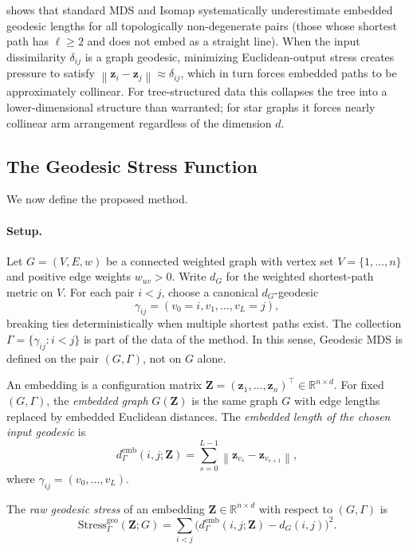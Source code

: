 \documentclass[twoside,11pt]{article}
\newcommand{\R}{\mathbb{R}}
\newcommand{\bz}{\mathbf{z}}
\newcommand{\bZ}{\mathbf{Z}}
\newcommand{\norm}[1]{\left\|#1\right\|}
\newcommand{\demb}{d^{\mathrm{emb}}}
\newcommand{\Stress}{\mathrm{Stress}}
\begin{document}
 shows that standard MDS and Isomap systematically
underestimate embedded geodesic lengths for all topologically
non-degenerate pairs (those whose shortest path has $\ell \geq 2$ and
does not embed as a straight line).  When the input dissimilarity
$\delta_{ij}$ is a graph geodesic, minimizing Euclidean-output stress
creates pressure to satisfy $\norm{\bz_i - \bz_j} \approx \delta_{ij}$,
which in turn forces embedded paths to be approximately collinear.
For tree-structured data this collapses the tree into a lower-dimensional
structure than warranted; for star graphs it forces nearly collinear arm
arrangement regardless of the dimension $d$.

\subsection{The Geodesic Stress Function}
\label{sec:geodesic_stress}

We now define the proposed method.

\paragraph{Setup.}
Let $G = (V,E,w)$ be a connected weighted graph with vertex set
$V = \{1,\ldots,n\}$ and positive edge weights $w_{uv} > 0$.  Write
$d_G$ for the weighted shortest-path metric on $V$.  For each pair
$i < j$, choose a canonical $d_G$-geodesic
\begin{equation}
  \gamma_{ij} = (v_0 = i, v_1, \ldots, v_L = j),
  \label{eq:canonical_geodesic}
\end{equation}
breaking ties deterministically when multiple shortest paths exist.  The
collection $\Gamma = \{\gamma_{ij} : i < j\}$ is part of the data of the
method.  In this sense, Geodesic MDS is defined on the pair $(G,\Gamma)$,
not on $G$ alone.

An embedding is a configuration matrix $\bZ = (\bz_1, \ldots, \bz_n)^\top
\in \R^{n \times d}$.  For fixed $(G,\Gamma)$, the \emph{embedded graph}
$G(\bZ)$ is the same graph $G$ with edge lengths replaced by embedded
Euclidean distances.  The \emph{embedded length of the chosen input
geodesic} is
\begin{equation}
  \demb_{\Gamma}(i,j;\bZ)
  = \sum_{s=0}^{L-1} \norm{\bz_{v_s} - \bz_{v_{s+1}}},
  \label{eq:emb_geodesic}
\end{equation}
where $\gamma_{ij} = (v_0, \ldots, v_L)$.

\begin{definition}
  \label{def:raw_geodesic_stress}
  The \emph{raw geodesic stress} of an embedding $\bZ \in \R^{n \times d}$
  with respect to $(G,\Gamma)$ is
  \begin{equation}
    \Stress^{\mathrm{geo}}_{\Gamma}(\bZ; G)
    = \sum_{i < j}
      \bigl(\demb_{\Gamma}(i,j;\bZ) - d_G(i,j)\bigr)^2.
    \label{eq:raw_geo_stress}
  \end{equation}
\end{definition}
\end{document}
